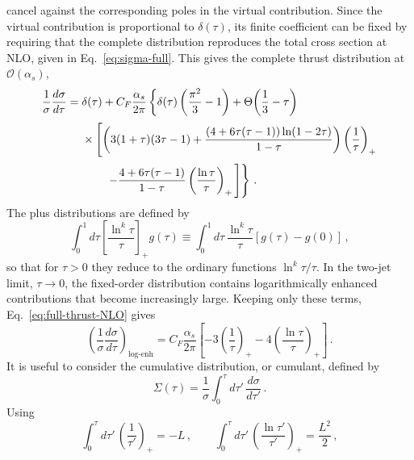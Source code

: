 cancel against the corresponding poles in the virtual contribution.
Since the virtual contribution is proportional to $\delta(\tau)$, its
finite coefficient can be fixed by requiring that the complete
distribution reproduces the total cross section at NLO, given in
Eq.~\eqref{eq:sigma-full}. This gives the complete thrust distribution at
$\mathcal{O}(\alpha_s)$,
\begin{equation}
\begin{aligned}
\label{eq:full-thrust-NLO}
    \frac{1}{\sigma}\frac{d\sigma}{d\tau}
    ={}& \delta(\tau)
    + C_F\frac{\alpha_s}{2\pi}
      \left\{
        \delta(\tau) \left( \frac{\pi^2}{3} - 1 \right)
        + \Theta\!\left(\frac{1}{3}-\tau\right)
      \right. \\[0.5ex]
    &\times \left[
        \left(
          3(1+\tau)(3\tau-1)
          + \frac{\left(4+6\tau(\tau-1)\right)\ln(1-2\tau)}{1-\tau}
        \right)
        \left( \frac{1}{\tau} \right)_+ \right. \\[0.5ex]
    &\left. \left.
        \qquad- \frac{4+6\tau(\tau-1)}{1-\tau}
          \left( \frac{\ln \tau}{\tau} \right)_+
        \vphantom{\frac{\left(4+6\tau(\tau-1)\right)\ln(1-2\tau)}{1-\tau}}
      \right]
    \right\}\,.
\end{aligned}
\end{equation}
The plus distributions are defined by
\begin{equation}
    \int_0^1 d\tau
    \left[\frac{\ln^k\tau}{\tau}\right]_{\!+}
    g(\tau)
    \equiv
    \int_0^1 d\tau\,\frac{\ln^k\tau}{\tau}
    \left[g(\tau)-g(0)\right]\,,
\end{equation}
so that for $\tau > 0$ they reduce to the ordinary functions
$\ln^k\tau/\tau$. 
In the two-jet limit, $\tau\to0$, the fixed-order distribution contains
logarithmically enhanced contributions that become increasingly large.
Keeping only these terms, Eq.~\eqref{eq:full-thrust-NLO} gives
\begin{equation}
    \left(\frac{1}{\sigma}\frac{d\sigma}{d\tau}\right)_{\!\text{log-enh}}
    = C_F \frac{\alpha_s}{2\pi}
      \left[
        -3 \left(\frac{1}{\tau}\right)_+
        - 4 \left(\frac{\ln \tau}{\tau}\right)_+
      \right]\,.
\end{equation}
It is useful to consider the cumulative distribution, or cumulant,
defined by
\begin{equation}
\label{eq:cumulant}
    \Sigma(\tau)
    = \frac{1}{\sigma}\int_0^\tau d\tau'\, \frac{d\sigma}{d\tau'}\,.
\end{equation}
Using 
\begin{equation}
\label{eq:plus-dist-integrals}
    \int_0^\tau d\tau'\,\left(\frac{1}{\tau'}\right)_+ = -L\,, 
    \qquad
    \int_0^\tau d\tau'\,\left(\frac{\ln\tau'}{\tau'}\right)_+ 
    = \frac{L^2}{2}\,,
\end{equation}
